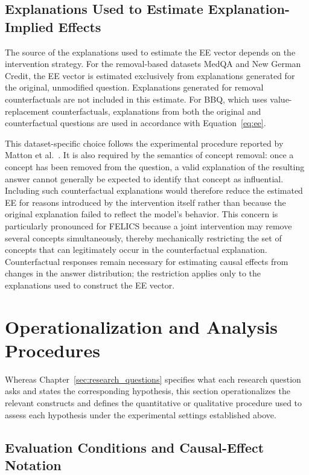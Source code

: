 \subsection{Explanations Used to Estimate Explanation-Implied Effects}
\label{sec:ee_evaluation_setup}
The source of the explanations used to estimate the EE vector depends on the intervention strategy. For the removal-based datasets MedQA and New German Credit, the EE vector is estimated exclusively from explanations generated for the original, unmodified question. Explanations generated for removal counterfactuals are not included in this estimate. For BBQ, which uses value-replacement counterfactuals, explanations from both the original and counterfactual questions are used in accordance with Equation~\ref{eq:ee}.

This dataset-specific choice follows the experimental procedure reported by Matton et al.~\cite{mattonWalkTalkMeasuring2024}. It is also required by the semantics of concept removal: once a concept has been removed from the question, a valid explanation of the resulting answer cannot generally be expected to identify that concept as influential. Including such counterfactual explanations would therefore reduce the estimated EE for reasons introduced by the intervention itself rather than because the original explanation failed to reflect the model's behavior. This concern is particularly pronounced for FELICS because a joint intervention may remove several concepts simultaneously, thereby mechanically restricting the set of concepts that can legitimately occur in the counterfactual explanation. Counterfactual responses remain necessary for estimating causal effects from changes in the answer distribution; the restriction applies only to the explanations used to construct the EE vector.

\section{Operationalization and Analysis Procedures}
\label{sec:analysis_procedures}

Whereas Chapter~\ref{sec:research_questions} specifies what each research question asks and states the corresponding hypothesis, this section operationalizes the relevant constructs and defines the quantitative or qualitative procedure used to assess each hypothesis under the experimental settings established above.

\subsection{Evaluation Conditions and Causal-Effect Notation}
\label{sec:controlled_atomic_baseline}

